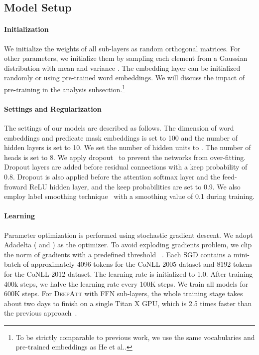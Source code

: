 \documentclass[letterpaper]{article} \usepackage{aaai18}  \usepackage{times}  \usepackage{helvet}  \usepackage{courier}  \usepackage{url}  \usepackage{graphicx}  \frenchspacing  \setlength{\pdfpagewidth}{8.5in}  \setlength{\pdfpageheight}{11in}  \usepackage{latexsym}
\begin{document}
\subsection{Model Setup}
\paragraph{Initialization} We initialize the weights of all sub-layers as random orthogonal matrices. For other parameters, we initialize them by sampling each element from a Gaussian distribution with mean  and variance . The embedding layer can be initialized randomly or using pre-trained word embeddings. We will discuss the impact of pre-training in the analysis subsection.\footnote{To be strictly comparable to previous work, we use the same vocabularies and pre-trained embeddings as He et al..}

\paragraph{Settings and Regularization} The settings of our models are described as follows. The dimension of word embeddings and predicate mask embeddings is set to 100 and the number of hidden layers is set to 10. We set the number of hidden units  to . The number of heads  is set to 8. We apply dropout~\cite{srivastava2014dropout} to prevent the networks from over-fitting. Dropout layers are added before residual connections with a keep probability of 0.8. Dropout is also applied before the attention softmax layer and the feed-froward ReLU hidden layer, and the keep probabilities are set to 0.9. We also employ label smoothing technique~\cite{szegedy2016rethinking} with a smoothing value of 0.1 during training.

\paragraph{Learning}
Parameter optimization is performed using stochastic gradient descent. We adopt Adadelta \cite{zeiler2012adadelta} ( and ) as the optimizer. To avoid exploding gradients problem, we clip the norm of gradients with a predefined threshold ~\cite{pascanu2013construct}. Each SGD contains a mini-batch of approximately 4096 tokens for the CoNLL-2005 dataset and 8192 tokens for the CoNLL-2012 dataset. The learning rate is initialized to 1.0. After training 400k steps, we halve the learning rate every 100K steps. We train all models for 600K steps. For \textsc{DeepAtt} with FFN sub-layers, the whole training stage takes about two days to finish on a single Titan X GPU, which is 2.5 times faster than the previous approach~\cite{he2017deep}.
\end{document}
